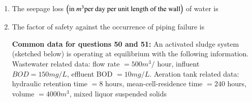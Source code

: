 \documentclass[journal]{IEEEtran}
\begin{document}
\begin{enumerate}
	\item  The seepage loss $\left(\text{in } m^{3} \text{per day per unit length of the wall}\right)$ of water is
		\begin{enumerate}
        	\end{enumerate}	
	\item The factor of safety against the occurrence of piping failure is
                \begin{enumerate}
         \end{enumerate}		
\textbf{Common data for questions 50 and 51:}
       An activated sludge system (sketched below) is operating at equilibrium with the following information. Wastewater related data: flow rate $=500 m^{3} /$ hour, influent $BOD=150 mg / L$, effluent BOD $=10 mg / L$. Aeration tank related data: hydraulic retention time $=8$ hours, mean-cell-residence time $=240$ hours, volume $=4000 m^{3}$, mixed liquor suspended solids 
       
       

\end{enumerate}
\end{document}
